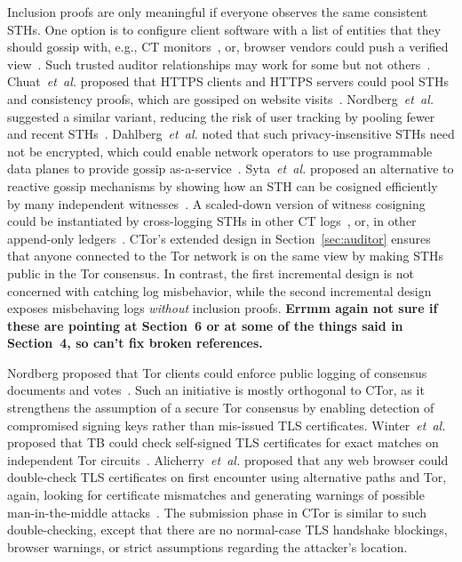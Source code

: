 Inclusion proofs are only meaningful if everyone observes the same consistent
STHs. One option is to configure client software with a list of entities that
they should gossip with, e.g., CT monitors~\cite{chase}, or, browser vendors
could push a verified view~\cite{sth-push}. Such trusted auditor relationships
may work for some but not others~\cite{nordberg}. Chuat~\emph{et~al.} proposed
that HTTPS clients and HTTPS servers could pool STHs and consistency proofs,
which are gossiped on website visits~\cite{chuat}. Nordberg~\emph{et~al.}
suggested a similar variant, reducing the risk of user tracking by pooling fewer
and recent STHs~\cite{nordberg}. Dahlberg~\emph{et~al.} noted that such
privacy-insensitive STHs need not be encrypted, which could enable network
operators to use programmable data planes to provide gossip
as-a-service~\cite{dahlberg}. Syta~\emph{et~al.} proposed an alternative to
reactive gossip mechanisms by showing how an STH can be cosigned efficiently by
many independent witnesses~\cite{syta}. A scaled-down version of witness
cosigning could be instantiated by cross-logging STHs in other CT
logs~\cite{minimal-gossip}, or, in other append-only ledgers~\cite{catena}.
CTor's extended design in Section~\ref{sec:auditor} ensures that anyone
connected to the Tor network is on the same view by making STHs public in the
Tor consensus.  In contrast, the first incremental design is not concerned with
catching log misbehavior, while the second incremental design exposes
misbehaving logs \emph{without} inclusion proofs.
{\bf \color{red} Errmm again not sure if these are pointing at Section~6
or at some of the things said in Section~4, so can't fix broken references.}

Nordberg proposed that Tor clients could enforce public logging of consensus
documents and votes~\cite{consensus-transparency}.  Such an initiative is
mostly orthogonal to CTor, as it strengthens the assumption of a secure Tor
consensus by enabling detection of compromised signing keys rather than
mis-issued TLS certificates.  Winter~\emph{et~al.} proposed that TB
could check self-signed TLS certificates for exact matches on independent Tor
circuits~\cite{spoiled-onions}.  Alicherry~\emph{et~al.} proposed that any web browser could
double-check TLS certificates on first encounter using alternative paths and
Tor, again, looking for certificate mismatches and generating warnings of
possible man-in-the-middle attacks~\cite{doublecheck}.  The submission phase in
CTor is similar to such double-checking, except that there are no
normal-case TLS handshake blockings, browser warnings, or strict
assumptions regarding the attacker's location.
